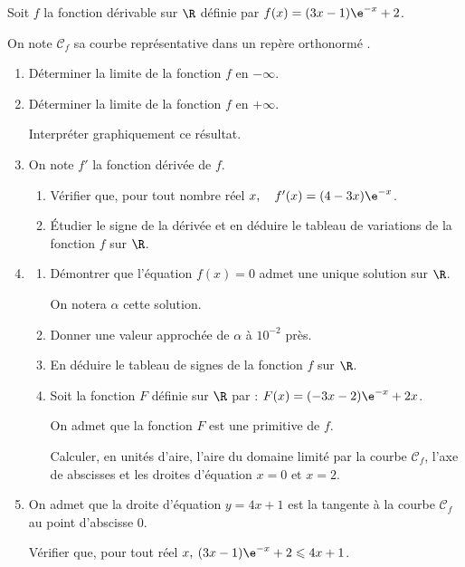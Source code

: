 Soit $f$ la fonction dérivable sur $\R$ définie par \quad
$f(x) = (3x- 1)\e^{-x} +2$.

On note $\mathcal{C}_f$ sa courbe représentative dans un repère orthonormé \Oij.


\begin{enumerate}
	\item Déterminer la limite de la fonction $f$ en $- \infty$.
	\item Déterminer la limite de la fonction $f$ en $+ \infty$.

	Interpréter graphiquement ce résultat.
	\item On note $f'$ la fonction dérivée de $f$.
	\begin{enumerate}
		\item Vérifier que, pour tout nombre réel $x,\quad f'(x) = (4 - 3x)\e^{-x}$.
		\item Étudier le signe de la dérivée et en déduire le tableau de variations de la fonction $f$ sur $\R$.
	\end{enumerate}
	\item \begin{enumerate}
		\item Démontrer que l'équation $f(x) = 0$ admet une unique solution sur $\R$.

		On notera $\alpha$ cette solution.

		\item Donner une valeur approchée de $\alpha$ à $10^{-2}$  près.
		\item En déduire le tableau de signes de la fonction $f$ sur $\R$.
		\item Soit la fonction $F$ définie sur $\R$ par : $F(x) =(- 3x - 2)\e^{-x} + 2x$.

		On admet que la fonction $F$ est une primitive de $f$.

		Calculer, en unités d'aire, l'aire du domaine limité par la courbe $\mathcal{C}_f$, l'axe de
		abscisses et les droites d'équation $x = 0$ et $x = 2$.
	\end{enumerate}
	\item  On admet que la droite d'équation $y = 4x + 1$ est la tangente à la courbe $\mathcal{C}_f$ au point d'abscisse 0.

	Vérifier que, pour tout réel $x,\: (3x - 1)\e^{-x} + 2 \leqslant 4x + 1$.
\end{enumerate}
